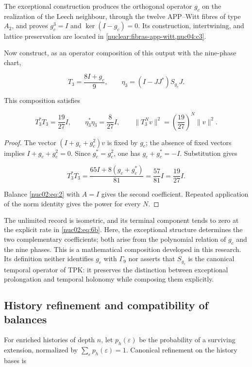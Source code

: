The exceptional construction produces the orthogonal operator \(g_c\) on the realization of the Leech neighbour, through the twelve APP–Witt fibres of type \(A_2\), and proves \(g_c^3=I\) and \(\ker(I-g_c)=0\). Its construction, intertwining, and lattice preservation are located in \cref{nuclear:fibras-app-witt,nuc04:c3}.

Now construct, as an operator composition of this output with the nine-phase chart,

\[
T_3=\frac{8I+g_c}{9},\qquad
\eta_3=(I-JJ^*)S_{g_c}J.
\]

\begin{corollary}
This composition satisfies

\begin{equation}
\boxed{T_3^*T_3=\frac{19}{27}I,\qquad
\eta_3^*\eta_3=\frac8{27}I,\qquad
\|T_3^Nv\|^2=\left(\frac{19}{27}\right)^N\|v\|^2.}\label{nuc02:eq:6b}
\end{equation}
\end{corollary}

\begin{proof}
The vector \((I+g_c+g_c^2)v\) is fixed by \(g_c\); the absence of fixed vectors implies \(I+g_c+g_c^2=0\). Since \(g_c^*=g_c^2\), one has \(g_c+g_c^*=-I\). Substitution gives

\[
T_3^*T_3=\frac{65I+8(g_c+g_c^*)}{81}
=\frac{57}{81}I=\frac{19}{27}I.
\]

Balance \eqref{nuc02:eq:2} with \(A=I\) gives the second coefficient. Repeated application of the norm identity gives the power for every \(N\).
\end{proof}

The unlimited record is isometric, and its terminal component tends to zero at the explicit rate in \eqref{nuc02:eq:6b}. Here, the exceptional structure determines the two complementary coefficients; both arise from the polynomial relation of \(g_c\) and the nine phases. This is a mathematical composition developed in this research. Its definition neither identifies \(g_c\) with \(\Gamma_9\) nor asserts that \(S_{g_c}\) is the canonical temporal operator of TPK: it preserves the distinction between exceptional prolongation and temporal holonomy while composing them explicitly.

\subsection{History refinement and compatibility of balances}

For enriched histories of depth \(n\), let \(p_h(\varepsilon)\) be the probability of a surviving extension, normalized by \(\sum_\varepsilon p_h(\varepsilon)=1\). Canonical refinement on the history bases is


